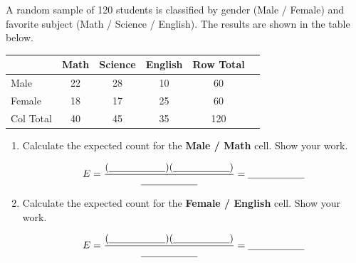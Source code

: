 \documentclass[10pt]{article}
\begin{document}
\namedateperiod

\vspace{0.1in}

A random sample of 120 students is classified by gender (Male / Female) and favorite
subject (Math / Science / English). The results are shown in the table below.

\vspace{0.1in}
\renewcommand{\arraystretch}{1.5}
\begin{tabular}{lccccc}
             & \textbf{Math} & \textbf{Science} & \textbf{English} & \textbf{Row Total} \\
    \hline
    Male   & 22 & 28 & 10 & 60 \\
    Female & 18 & 17 & 25 & 60 \\
    \hline
    Col Total & 40 & 45 & 35 & 120 \\
\end{tabular}

\begin{enumerate}

  \item Calculate the expected count for the \textbf{Male / Math} cell. Show your work.

        \[
            E = \frac{(\blank{2cm})(\blank{2cm})}{\blank{2cm}} = \blank{2cm}
        \]

  \item Calculate the expected count for the \textbf{Female / English} cell. Show your work.

        \[
            E = \frac{(\blank{2cm})(\blank{2cm})}{\blank{2cm}} = \blank{2cm}
        \]

\end{enumerate}
\end{document}

